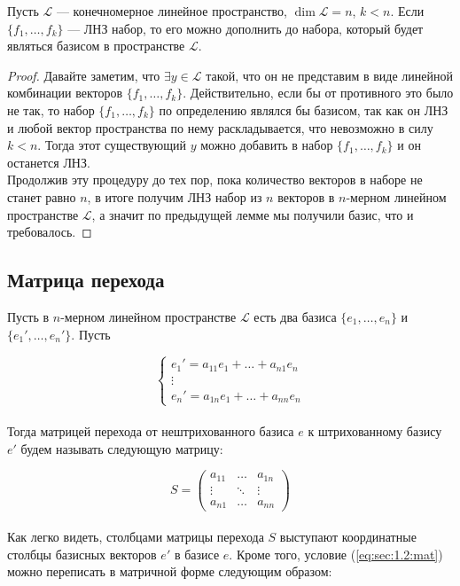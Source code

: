 \documentclass[11pt]{article}
\begin{document}
\begin{lemma} \label{lemma:1.2}
    Пусть $\mathcal{L}$ --- конечномерное линейное пространство, $\dim \mathcal{L} = n$, $k < n$. Если $\{f_1, \ldots, f_k\}$ --- ЛНЗ набор, то его 
    можно дополнить до набора, который будет являться базисом в пространстве $\mathcal{L}$.
\end{lemma}

\begin{proof}
    Давайте заметим, что $\exists y \in \mathcal{L}$ такой, что он не представим в виде линейной комбинации векторов $\{f_1, \ldots, f_k\}$.
    Действительно, если бы от противного это было не так, то набор $\{f_1, \ldots, f_k\}$ по определению являлся бы базисом, так как он ЛНЗ и любой вектор пространства по нему раскладывается, что невозможно в силу $k < n$.
    Тогда этот существующий $y$ можно добавить в набор $\{f_1, \ldots, f_k\}$ и он останется ЛНЗ. 
    \\
    Продолжив эту процедуру до тех пор, пока 
    количество векторов в наборе не станет равно $n$, в итоге получим ЛНЗ набор из $n$ векторов в $n$-мерном линейном пространстве $\mathcal{L}$, а значит 
    по предыдущей лемме мы получили базис, что и требовалось.
\end{proof}

\subsection{Матрица перехода}

Пусть в $n$-мерном линейном пространстве $\mathcal{L}$ есть два базиса $\{e_1, \ldots, e_n\}$ и $\{e_1', \ldots, e_n'\}$. Пусть 

\begin{equation*} \label{eq:sec:1.2:mat} \tag{$\ast$}
    \begin{cases}
        e_1' = a_{11} e_1 + \ldots + a_{n1} e_n \\
        \vdots \\
        e_n' = a_{1n} e_1 + \ldots + a_{nn} e_n
    \end{cases}
\end{equation*} \leavevmode
\\
Тогда матрицей перехода от нештрихованного базиса $e$ к штрихованному базису $e'$ будем называть следующую матрицу:

\begin{equation*}
    S = 
    \begin{pmatrix}
        a_{11} & \ldots & a_{1n} \\
        \vdots & \ddots & \vdots \\ 
        a_{n1} & \ldots & a_{nn}
    \end{pmatrix}
\end{equation*} \leavevmode
\\
Как легко видеть, столбцами матрицы перехода $S$ выступают координатные столбцы базисных векторов $e'$ в базисе $e$. Кроме того, условие (\ref{eq:sec:1.2:mat}) 
можно переписать в матричной форме следующим образом:
\end{document}
